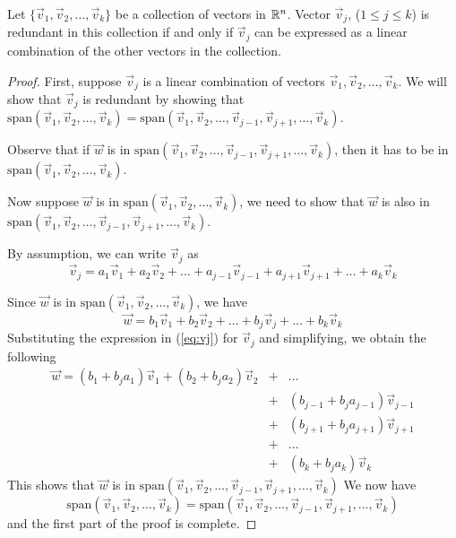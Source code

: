 \documentclass{ximera}
\begin{document}
 \begin{theorem}\label{th:redundant}
     Let $\{\vec{v}_1,\vec{v}_2,\dots,\vec{v}_k\}$ be a collection of vectors in $\mathbb{R}^n$.  Vector $\vec{v}_j$, ($1\leq j\leq k$) is redundant in this collection if and only if $\vec{v}_j$ can be expressed as a linear combination of the other vectors in the collection.
 \end{theorem}
 \begin{proof}
     First, suppose $\vec{v}_j$ is a linear combination of vectors $\vec{v}_1,\vec{v}_2,\dots,\vec{v}_k$.  We will show that $\vec{v}_j$ is redundant by showing that $\mbox{span}\left(\vec{v}_1,\vec{v}_2,\dots,\vec{v}_k\right)=\mbox{span}\left(\vec{v}_1,\vec{v}_2,\dots,\vec{v}_{j-1},\vec{v}_{j+1},\dots,\vec{v}_k\right)$.

Observe that if $\vec{w}$ is in $\mbox{span}\left(\vec{v}_1,\vec{v}_2,\dots,\vec{v}_{j-1},\vec{v}_{j+1},\dots,\vec{v}_k\right)$, then it has to be in $\mbox{span}\left(\vec{v}_1,\vec{v}_2,\dots,\vec{v}_k\right)$.

Now suppose $\vec{w}$ is in $\mbox{span}\left(\vec{v}_1,\vec{v}_2,\dots,\vec{v}_k\right)$, we need to show that $\vec{w}$ is also in $\mbox{span}\left(\vec{v}_1,\vec{v}_2,\dots,\vec{v}_{j-1},\vec{v}_{j+1},\dots,\vec{v}_k\right)$.

     By assumption, we can write $\vec{v}_j$ as
\begin{equation}\label{eq:vj}
\vec{v}_j=a_1\vec{v}_1+a_2\vec{v}_2+\dots +a_{j-1}\vec{v}_{j-1}+a_{j+1}\vec{v}_{j+1}+\dots +a_k\vec{v}_k
\end{equation}

Since $\vec{w}$ is in $\mbox{span}\left(\vec{v}_1,\vec{v}_2,\dots,\vec{v}_k\right)$, we have
$$\vec{w}=b_1\vec{v}_1+b_2\vec{v}_2+\dots +b_j\vec{v}_j+\dots +b_k\vec{v}_k$$
Substituting the expression in (\ref{eq:vj}) for $\vec{v}_j$ and simplifying, we obtain the following
\begin{eqnarray*}\vec{w}=(b_1+b_ja_1)\vec{v}_1+(b_2+b_ja_2)\vec{v}_2&+&\dots\\
&+&(b_{j-1}+b_ja_{j-1})\vec{v}_{j-1}\\
&+&(b_{j+1}+b_ja_{j+1})\vec{v}_{j+1}\\
&+&\dots\\
&+&(b_k+b_ja_k)\vec{v}_k\end{eqnarray*}
This shows that $\vec{w}$ is in $\mbox{span}\left(\vec{v}_1,\vec{v}_2,\dots,\vec{v}_{j-1},\vec{v}_{j+1},\dots,\vec{v}_k\right)$
We now have 
$$\mbox{span}\left(\vec{v}_1,\vec{v}_2,\dots,\vec{v}_k\right)=\mbox{span}\left(\vec{v}_1,\vec{v}_2,\dots,\vec{v}_{j-1},\vec{v}_{j+1},\dots,\vec{v}_k\right)$$
and the first part of the proof is complete.


\end{proof}
\end{document}

